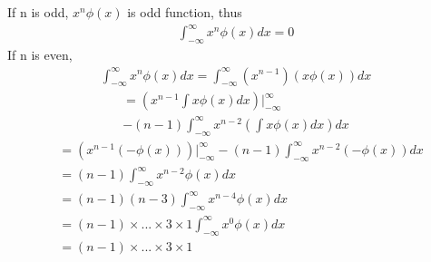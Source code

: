 \documentclass[journal,12pt,twocolumn]{IEEEtran}
\begin{document}
If n is odd, $x^n\phi(x)$ is odd function, thus
\begin{align}
    \int_{-\infty}^{\infty} x^n \phi(x)dx = 0
\end{align}
If n is even, 
\begin{align}
    \int_{-\infty}^{\infty} x^n \phi(x)dx = \int_{-\infty}^{\infty} (x^{n-1}) (x\phi(x))dx
\end{align}
\begin{multline}
    = \left(x^{n-1}\int x\phi(x)dx\right)\biggr \vert_{-\infty}^{\infty}\\
       - (n-1)\int_{-\infty}^{\infty}x^{n-2}\left(\int x\phi(x)dx\right) dx
\end{multline}
\begin{align}
    &= \left(x^{n-1}(-\phi(x))\right)\biggr \vert_{-\infty}^{\infty}
           - (n-1)\int_{-\infty}^{\infty}x^{n-2}(-\phi(x)) dx\\
    &= (n-1)\int_{-\infty}^{\infty} x^{n-2} \phi(x)dx\\
    &= (n-1)(n-3)\int_{-\infty}^{\infty} x^{n-4} \phi(x)dx\\
    &= (n-1)\times...\times3\times1\int_{-\infty}^{\infty} x^0 \phi(x)dx\\
    &= (n-1)\times...\times3\times1
\end{align}
\end{document}

